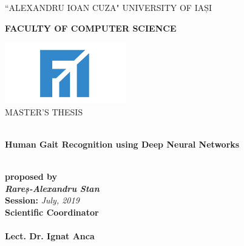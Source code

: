 \documentclass[12pt]{article}
\theoremstyle{definition}
\begin{document}
	\begin{titlepage}
		\begin{center}
			\vspace{1cm}
			``ALEXANDRU IOAN CUZA" UNIVERSITY OF IAȘI
			\
			\\
			\begin{large}
				\textbf{FACULTY OF COMPUTER SCIENCE}\\
			\end{large}
			\vspace{2.5cm}
			\includegraphics{fii.png}
			\
			\\
			\vspace{1cm}
			MASTER'S THESIS
			\begin{large}
				\
				\\
				\vspace{1.5cm}
				\textbf{Human Gait Recognition using Deep Neural Networks}
			\end{large}
			\\
			\vspace{1.5cm}
			\textbf{proposed by}
			\\
			\vspace{1.5cm}
			\textit{\textbf{Rareș-Alexandru Stan}}
			\\
			\vspace{2cm}
			\textbf{Session:} \textit{July, 2019}
			\\
			\vspace{1.5cm}
			\textbf{Scientific Coordinator}
			\
			\\
			\
			\\
			\textbf{Lect. Dr. Ignat Anca}

		\end{center}
	\end{titlepage}
	\clearpage
\end{document}
